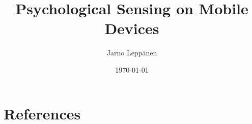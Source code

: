 \documentclass[english]{tktltiki2}
\title{Psychological Sensing on Mobile Devices}
\author{Jarno Leppänen}
\date{\today}
\theoremstyle{definition}
\theoremstyle{remark}
\begin{document}

\frontmatter      %

\maketitle        %

\tableofcontents  %


\mainmatter       %



%
%
% 
%

\section{References}
\nocite{*}





%
\end{document}
